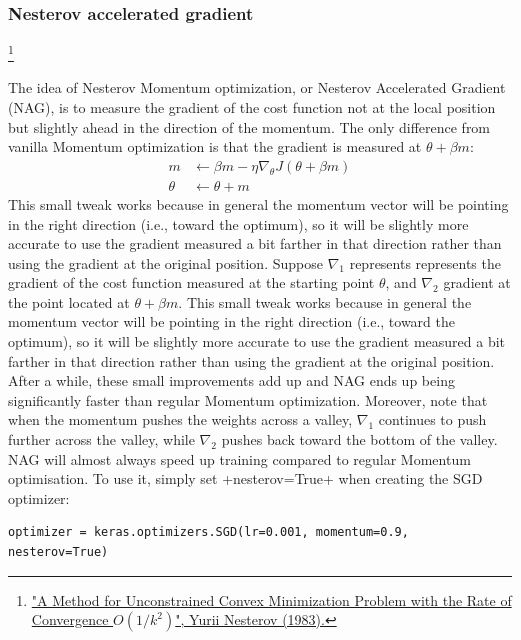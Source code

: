 \subsubsection{Nesterov accelerated gradient}\footnote{\href{https://homl.info/55}{"A Method for Unconstrained Convex Minimization Problem with the Rate of Convergence $O(1/k^2)$", Yurii Nesterov (1983).}}

The idea of Nesterov Momentum optimization, or Nesterov Accelerated Gradient (NAG), is to measure the gradient of the cost function not at the local position but slightly ahead in the direction of the momentum. The only difference from vanilla Momentum optimization is that the gradient is measured at $\theta + \beta m$:
\begin{equation}
\begin{aligned}
m &\leftarrow \beta m - \eta \nabla_\theta J(\theta+\beta m)\\
\theta &\leftarrow \theta + m
\end{aligned}
\end{equation}
This small tweak works because in general the momentum vector will be pointing in the right direction (i.e., toward the optimum), so it will be slightly more accurate to use the gradient measured a bit farther in that direction rather than using the gradient at the original position. Suppose $\nabla_1$ represents represents the gradient of the cost function measured at the starting point $\theta$, and $\nabla_2$ gradient at the point located at $\theta + \beta m$. This small tweak works because in general the momentum vector will be pointing in the right direction (i.e., toward the optimum), so it will be slightly more accurate to use the gradient measured a bit farther in that direction rather than using the gradient at the original position. After a while, these small improvements add up and NAG ends up being significantly faster than regular Momentum optimization. Moreover, note that when the momentum pushes the weights across a valley, $\nabla_1$ continues to push further across the valley, while $\nabla_2$ pushes back toward the bottom of the valley. NAG will almost always speed up training compared to regular Momentum optimisation. To use it, simply set \cd+nesterov=True+ when creating the SGD optimizer:
\begin{lstlisting}
optimizer = keras.optimizers.SGD(lr=0.001, momentum=0.9, nesterov=True)
\end{lstlisting}
